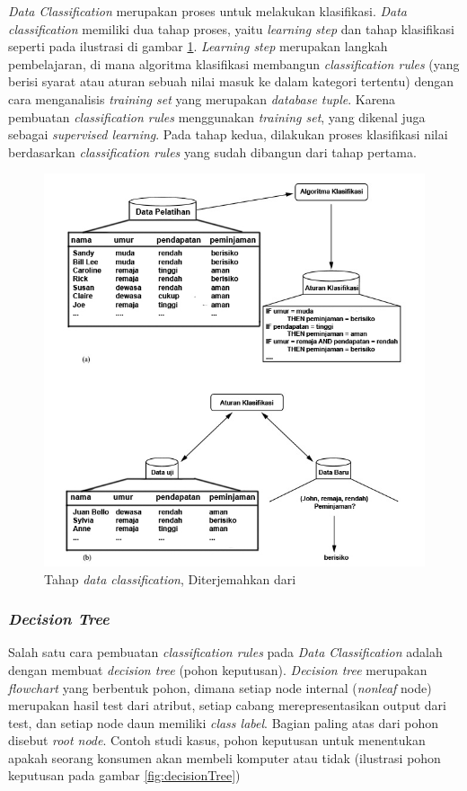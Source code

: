 \textsl{Data Classification} merupakan proses untuk melakukan klasifikasi. \textsl{Data classification} memiliki dua tahap proses, yaitu \textsl{learning step} dan tahap klasifikasi seperti pada ilustrasi di gambar \ref{fig:tahapDataClassification}. \textsl{Learning step} merupakan langkah pembelajaran, di mana algoritma klasifikasi membangun \textsl{classification rules} (yang berisi syarat atau aturan sebuah nilai masuk ke dalam kategori tertentu) dengan cara menganalisis \textsl{training set} yang merupakan \textsl{database tuple}. Karena pembuatan \textsl{classification rules} menggunakan \textsl{training set}, yang dikenal juga sebagai \textsl{supervised learning}. 
Pada tahap kedua, dilakukan proses klasifikasi nilai berdasarkan \textsl{classification rules} yang sudah dibangun dari tahap pertama.

\begin{figure}
\centering
\includegraphics[scale=0.8]{Gambar/tahapdataclassification.jpg}
\caption[Tahap \textsl{data classification}]{Tahap \textsl{data classification}, Diterjemahkan dari \cite{DM}} 
\label{fig:tahapDataClassification}
\end{figure}

\subsubsection{\textsl{Decision Tree}}
Salah satu cara pembuatan \textsl{classification rules} pada \textsl{Data Classification} adalah dengan membuat \textsl{decision tree} (pohon keputusan). \textsl{Decision tree} merupakan \textsl{flowchart} yang berbentuk pohon, dimana setiap node internal (\textsl{nonleaf} node) merupakan hasil test dari atribut, setiap cabang merepresentasikan output dari test, dan setiap node daun memiliki \textsl{class label}. Bagian paling atas dari pohon disebut \textsl{root node}. Contoh studi kasus, pohon keputusan untuk menentukan apakah seorang konsumen akan membeli komputer atau tidak (ilustrasi pohon keputusan pada gambar \ref{fig:decisionTree}) 

